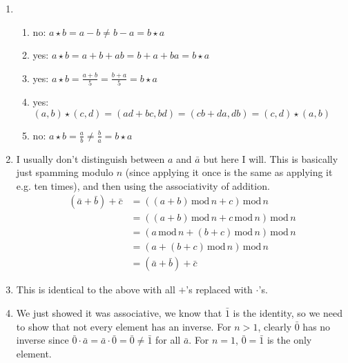 \documentclass[]{article}
\newcommand{\md}{\,\text{mod}\,}
\begin{document}
\begin{enumerate}
\item \begin{enumerate}
\item no: $a\star b = a - b \neq b - a = b\star a$
\item yes: $a\star b = a + b + ab = b + a + ba = b\star a$
\item yes: $a\star b = \frac{a+b}{5} = \frac{b+a}{5} = b\star a$
\item yes: $(a,b)\star (c,d) = (ad+bc,bd) = (cb+da,db) = (c,d)\star (a,b)$
\item no: $a\star b = \frac{a}{b} \neq \frac{b}{a} = b\star a$
\end{enumerate}


\item I usually don't distinguish between $a$ and $\bar{a}$ but here I will. This is basically just spamming modulo $n$ (since applying it once is the same as applying it e.g. ten times), and then using the associativity of addition.
\begin{align}
(\bar{a} + \bar{b}) + \bar{c} &= \left( (a+b)\md n + c \right) \md n \\
&= \left( (a+b)\md n + c\md n \right) \md n \\
&= \left( a\md n + (b+c)\md n \right) \md n \\
&= \left( a + (b+c)\md n \right) \md n \\
&= (\bar{a} + \bar{b}) + \bar{c}
\end{align}


\item This is identical to the above with all $+$'s replaced with $\cdot$'s.


\item We just showed it was associative, we know that $\bar{1}$ is the identity, so we need to show that not every element has an inverse. For $n>1$, clearly $\bar{0}$ has no inverse since $\bar{0}\cdot\bar{a} = \bar{a}\cdot\bar{0} = \bar{0} \neq \bar{1}$ for all $\bar{a}$. For $n=1$, $\bar{0} = \bar{1}$ is the only element.



\end{enumerate}
\end{document}
